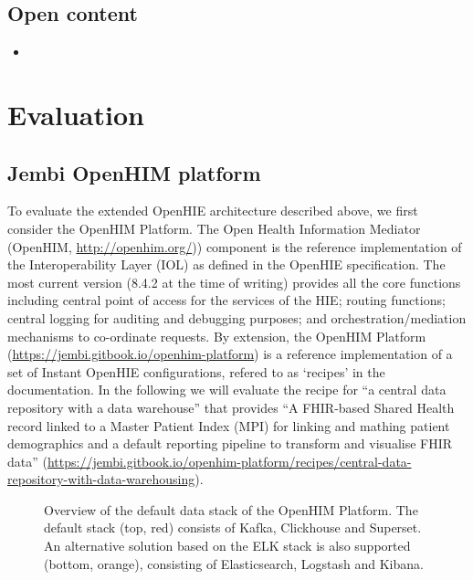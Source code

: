 \documentclass[
  authoryear]{elsarticle}
\providecommand{\tightlist}{%
  \setlength{\itemsep}{0pt}\setlength{\parskip}{0pt}}\usepackage{longtable,booktabs,array}
\begin{document}
\subsection{Open content}\label{open-content}

\begin{itemize}
\tightlist
\item
\end{itemize}

\section{Evaluation}\label{evaluation}

\subsection{Jembi OpenHIM platform}\label{jembi-openhim-platform}

To evaluate the extended OpenHIE architecture described above, we first
consider the OpenHIM Platform. The Open Health Information Mediator
(OpenHIM, \href{OpenHIMhttp://openhim.org/}{http://openhim.org/}))
component is the reference implementation of the Interoperability Layer
(IOL) as defined in the OpenHIE specification. The most current version
(8.4.2 at the time of writing) provides all the core functions including
central point of access for the services of the HIE; routing functions;
central logging for auditing and debugging purposes; and
orchestration/mediation mechanisms to co-ordinate requests. By
extension, the OpenHIM Platform
(\url{https://jembi.gitbook.io/openhim-platform}) is a reference
implementation of a set of Instant OpenHIE configurations, refered to as
`recipes' in the documentation. In the following we will evaluate the
recipe for ``a central data repository with a data warehouse'' that
provides ``A FHIR-based Shared Health record linked to a Master Patient
Index (MPI) for linking and mathing patient demographics and a default
reporting pipeline to transform and visualise FHIR data''
(\url{https://jembi.gitbook.io/openhim-platform/recipes/central-data-repository-with-data-warehousing}).

\begin{figure}


\caption{\label{fig-openhim-platform}Overview of the default data stack
of the OpenHIM Platform. The default stack (top, red) consists of Kafka,
Clickhouse and Superset. An alternative solution based on the ELK stack
is also supported (bottom, orange), consisting of Elasticsearch,
Logstash and Kibana.}

\end{figure}%
\end{document}
